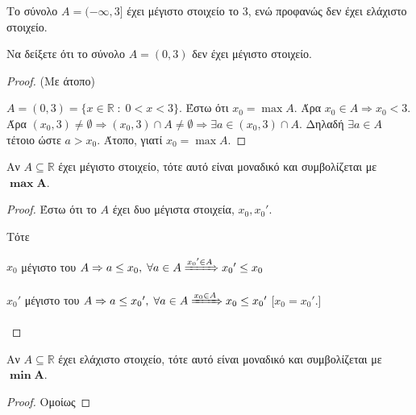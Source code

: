 \begin{example}
  Το σύνολο $ A=(- \infty, 3] $ έχει μέγιστο στοιχείο το 3, ενώ προφανώς δεν έχει 
  ελάχιστο στοιχείο.
\end{example}

\begin{example}
  Να δείξετε ότι το σύνολο $ A = (0,3) $ δεν έχει μέγιστο στοιχείο.
\end{example}
\begin{proof}(Με άτοπο)
\item {}
  $ A = (0,3) = \{ x \in \mathbb{R} \; : \; 0 < x < 3 \} $. 
  Έστω ότι $ x_{0} = \max A $. Άρα $ x_{0} \in A \Rightarrow  x_{0} 
  < 3$. Άρα  $ (x_{0}, 3) \neq \emptyset \Rightarrow (x_{0},3) \cap A \neq 
  \emptyset \Rightarrow \exists a \in (x_{0},3) \cap A $. Δηλαδή $ 
  \exists a \in A$ τέτοιο ώστε $ a > x_{0} $. Άτοπο, γιατί $ x_{0}= \max A $.
\end{proof}

\begin{mybox3}
\begin{prop}
  Αν $ A \subseteq \mathbb{R} $ έχει μέγιστο στοιχείο, τότε αυτό είναι 
  μοναδικό και συμβολίζεται με $ \bm{\max A} $.
\end{prop}
\end{mybox3}
\begin{proof}
  Έστω ότι το $A$ έχει δυο μέγιστα στοιχεία,  $ x_{0}, {x_{0}}' $.

  Τότε 
  \begin{myitemize}
    \item $ x_{0} $ μέγιστο του $A \Rightarrow a \leq x_{0}, \; \forall a \in A \xRightarrow{{x_{0}}' 
      \in A } {x_{0}}'  \leq x_{0} $ 
    \item $ x_{0}' $ μέγιστο του $ A \Rightarrow a \leq {x_{0}}', \; \forall a \in A \xRightarrow{x_{0} 
      \in A } x_{0} \leq {x_{0}}' $ 
      [$ x_{0} = {x_{0}}' $.] 
  \end{myitemize}
\end{proof}

\begin{mybox3}
\begin{prop}
  Αν $ A \subseteq \mathbb{R} $ έχει ελάχιστο στοιχείο, τότε αυτό είναι 
  μοναδικό και συμβολίζεται με $ \bm{\min A} $.
\end{prop}
\end{mybox3}

\begin{proof}
  Ομοίως 
\end{proof}

